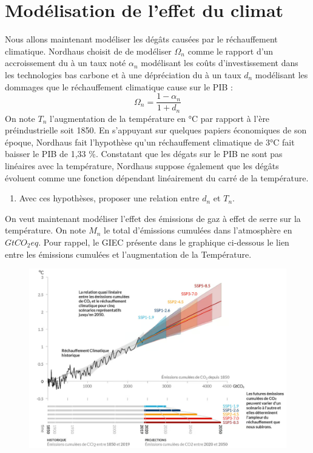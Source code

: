 \documentclass[12pt]{article}
\newcommand{\tco}{tCO_2eq}
\newcommand{\ques}[1]{\begin{enumerate}[resume]
\item  #1
\end{enumerate}}
\newcommand{\rep}[1]{\textit{Réponse :} #1 \\}
\renewcommand{\rep}[1]{ }
\theoremstyle{remark}
\begin{document}
\section{Modélisation de l'effet du climat}

Nous allons maintenant modéliser les dégâts causées par le réchauffement climatique. Nordhaus choisit de de modéliser $\Omega_n$ comme le rapport d'un accroissement du à un taux noté $\alpha_n$ modélisant les coûts d'investissement dans les technologies bas carbone et à une dépréciation du à un taux $d_n$ modélisant les dommages que le réchauffement climatique cause sur le PIB :
\begin{equation*}
\Omega_n=\frac{1-\alpha_n}{1+d_n}
\end{equation*}
On note $T_n$ l'augmentation de la température en °C par rapport à l'ère préindustrielle soit 1850.
En s'appuyant sur quelques papiers économiques de son époque, Nordhaus fait l'hypothèse qu'un réchauffement climatique de 3°C fait baisser le PIB de 1,33 \%. 
Constatant que les dégats sur le PIB ne sont pas linéaires avec la température, Nordhaus suppose également que les dégâts évoluent comme une fonction dépendant linéairement du carré de la température.


\ques{  Avec ces hypothèses, proposer une relation entre $d_n$ et $T_n$. \label{ques:degat_nordhaus}
}
\rep{ \begin{equation*}
d_{n}=0,0133(\frac{T_n}{3})^2 \end{equation*}
}

On veut maintenant modéliser l'effet des émissions de gaz à effet de serre sur la température. On note $M_n$ le total d'émissions cumulées dans l'atmosphère en $G\tco$. Pour rappel, le GIEC présente dans le graphique ci-dessous le lien entre les émissions cumulées et l'augmentation de la Température.
\begin{figure}[h]
\centering
\includegraphics[scale=0.4]{images/Lien_GES_temperature.png}
\end{figure}
\end{document}
